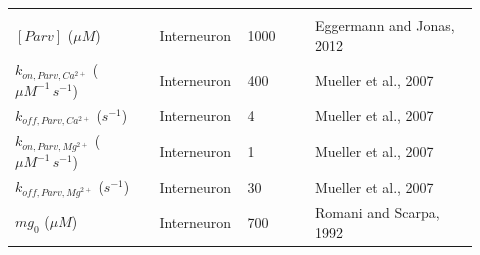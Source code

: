 \begin{table}[htbp]
\begin{tabular}{L{0.30\linewidth} C{0.14\linewidth} C{0.14\linewidth} L{0.34\linewidth}}
\addlinespace[0.45em]
 \\
\addlinespace[0.15em]
$[Parv]$ ($\mu M$) & Interneuron & 1000 & Eggermann and Jonas, 2012 \\
$k_{on, Parv, Ca^{2+}}$ ($\mu M^{-1}\,s^{-1}$) & Interneuron & 400 & Mueller et al., 2007 \\
$k_{off, Parv, Ca^{2+}}$ ($s^{-1}$) & Interneuron & 4 & Mueller et al., 2007 \\
$k_{on, Parv, Mg^{2+}}$ ($\mu M^{-1}\,s^{-1}$) & Interneuron & 1 & Mueller et al., 2007 \\
$k_{off, Parv, Mg^{2+}}$ ($s^{-1}$) & Interneuron & 30 & Mueller et al., 2007 \\
$mg_0$ ($\mu M$) & Interneuron & 700 & Romani and Scarpa, 1992 \\
\bottomrule
\end{tabular}
\end{table}

\providecommand{\lbrack}{[}
\providecommand{\rbrack}{]}

